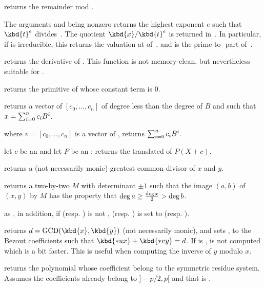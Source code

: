  returns the remainder  mod
.

 The arguments  and
 being nonzero  returns the highest exponent $e$ such that
$\kbd{t}^{e}$ divides~. The quotient $\kbd{x}/\kbd{t}^{e}$ is returned
in~. In particular, if  is irreducible, this returns the
valuation at  of~, and  is the prime-to- part
of~.

 returns the derivative of .
This function is not memory-clean, but nevertheless suitable for
.

 returns the primitive of  whose
constant term is $0$.

 returns a vector of 
$[c_0,\ldots,c_n]$ of degree less than the degree of $B$ and such that
$x=\sum_{i=0}^{n}{c_i\*B^i}$.

 where $v=[c_0,\ldots,c_n]$
is a vector of , returns $\sum_{i=0}^{n}{c_i\*B^i}$.

 let $c$ be an  and let
$P$ be an ; returns the translated  of $P(X+c)$.

 returns a (not necessarily monic)
greatest common divisor of $x$  and $y$.

 returns a two-by-two 
$M$ with determinant $\pm 1$ such that the image $(a,b)$ of $(x,y)$ by $M$
has the property that $\deg a \geq {\deg x \over 2} > \deg b$.

as , in addition, if  (resp. ) is not
,  (resp. )
is set to  (resp. ).

 returns
$d = \text{GCD}(\kbd{x},\kbd{y})$ (not necessarily monic), and sets ,
 to the Bezout coefficients such that $\kbd{*ux} + \kbd{*vy} = d$.
If  is ,  is not computed which is a bit faster.
This is useful when computing the inverse of $y$ modulo $x$.

 returns the polynomial whose
coefficient belong to the symmetric residue system. Assumes the coefficients
already belong to $]-p/2, p[$ and that  is .


